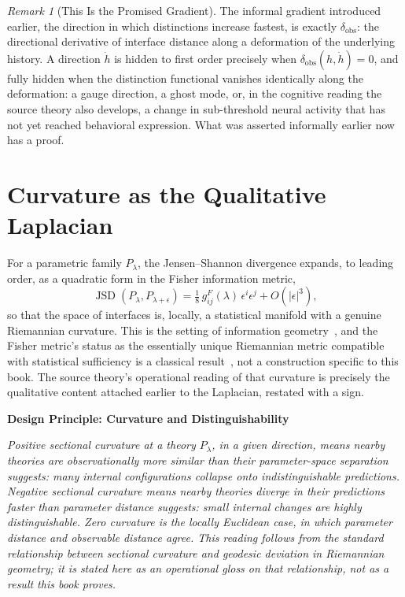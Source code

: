 \documentclass[11pt,fleqn]{book}
\numberwithin{equation}{chapter}
\newenvironment{principle}[1]
  {\begin{principleEnv}
   \noindent\textbf{Design Principle: #1}\par\smallskip\itshape}
  {\end{principleEnv}}
\theoremstyle{plain}
\theoremstyle{definition}
\theoremstyle{remark}
\newtheorem{remark}[theorem]{Remark}
\begin{document}
\begin{remark}[This Is the Promised Gradient]
The informal gradient introduced earlier, the direction in which distinctions increase fastest, is exactly \(\delta_{\mathrm{obs}}\): the directional derivative of interface distance along a deformation of the underlying history. A direction \(\dot h\) is hidden to first order precisely when \(\delta_{\mathrm{obs}}(h,\dot h)=0\), and fully hidden when the distinction functional vanishes identically along the deformation: a gauge direction, a ghost mode, or, in the cognitive reading the source theory also develops, a change in sub-threshold neural activity that has not yet reached behavioral expression. What was asserted informally earlier now has a proof.
\end{remark}

\section{Curvature as the Qualitative Laplacian}

For a parametric family \(P_\lambda\), the Jensen--Shannon divergence expands, to leading order, as a quadratic form in the Fisher information metric,
\begin{equation}
\operatorname{JSD}(P_\lambda,P_{\lambda+\epsilon}) = \tfrac18\, g^F_{ij}(\lambda)\,\epsilon^i\epsilon^j + O(|\epsilon|^3),
\end{equation}
so that the space of interfaces is, locally, a statistical manifold with a genuine Riemannian curvature. This is the setting of information geometry~\cite{amari2000}, and the Fisher metric's status as the essentially unique Riemannian metric compatible with statistical sufficiency is a classical result~\cite{chentsov1982}, not a construction specific to this book. The source theory's operational reading of that curvature is precisely the qualitative content attached earlier to the Laplacian, restated with a sign.

\begin{principle}{Curvature and Distinguishability}
Positive sectional curvature at a theory \(P_\lambda\), in a given direction, means nearby theories are observationally more similar than their parameter-space separation suggests: many internal configurations collapse onto indistinguishable predictions. Negative sectional curvature means nearby theories diverge in their predictions faster than parameter distance suggests: small internal changes are highly distinguishable. Zero curvature is the locally Euclidean case, in which parameter distance and observable distance agree. This reading follows from the standard relationship between sectional curvature and geodesic deviation in Riemannian geometry; it is stated here as an operational gloss on that relationship, not as a result this book proves.
\end{principle}
\end{document}
